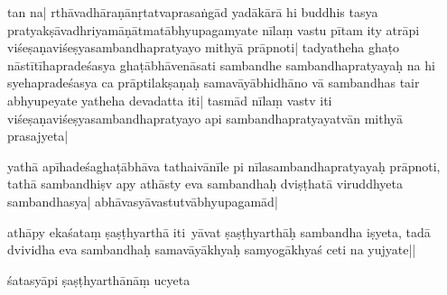 tan na|
rthāvadhāraṇānṛtatvaprasaṅgād yadākārā hi bu\mme ddhis tasya pratyakṣāvadhriyamāṇātmatābhyupagamyate %
nīlaṃ vastu pītam ity atrāpi viśeṣaṇaviśeṣyasambandhapratyayo mithyā prāpnoti| %
tadyatheha ghaṭo nāstītīhapradeśasya ghaṭābhāvenāsati sambandhe sambandhapratyayaḥ \mme
na hi syehapradeśasya ca prāpti\mms lakṣaṇaḥ samavāyābhidhāno vā sambandhas tair abhyupeyate yatheha devadatta iti| %
tasmād %
%
nīlaṃ vastv iti viśeṣaṇaviśeṣyasambandhapratyayo api sambandhapratyayatvān mi\mme thyā prasajyeta|

yathā 
%
apīhadeśaghaṭābhāva\mms %
tathaivānīle pi
nīlasambandhapratyayaḥ prāpnoti, tathā sambandhiṣv apy athāsty eva sambandhaḥ dviṣṭhatā viruddhyeta sambandhasya| a\mme bhāvasyāvastutvābhyupagamād|

athāpy ekaśataṃ ṣaṣṭhyarthā i\mms ti\ yāvat ṣaṣṭhyarthāḥ sambandha iṣyeta, ta\mme dā dvividha eva sam\mms bandhaḥ samavāyākhyaḥ samyogākhyaś ceti na yujyate|| %

śatasyāpi ṣaṣṭhyarthānāṃ %
ucyeta 

